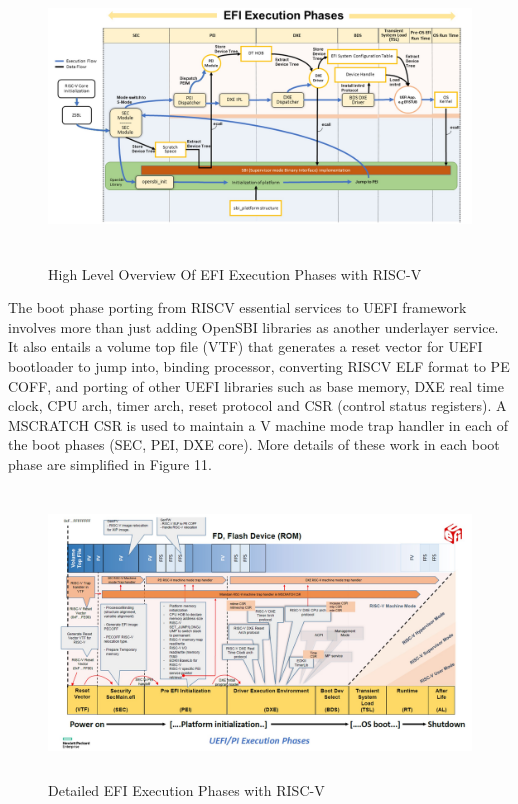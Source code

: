 \documentclass[review]{elsarticle}
\begin{document}
\begin{figure}[H]
	\centering
	\includegraphics[width=1\textwidth,height=3in]{figs/HighLevelOverviewOfEfi.JPG}
	\caption{High Level Overview Of EFI Execution Phases with RISC-V \cite{R51:2}}
\end{figure}

The boot phase porting from RISCV essential services to UEFI framework involves more than just adding OpenSBI libraries as another underlayer service. It also entails a volume top file (VTF) that generates a reset vector for UEFI bootloader to jump into, binding processor, converting RISCV ELF format to PE COFF, and porting of other UEFI libraries such as base memory, DXE real time clock, CPU arch, timer arch, reset protocol and CSR (control status registers). A MSCRATCH CSR is used to maintain a V machine mode trap handler in each of the boot phases (SEC, PEI, DXE core). More details of these work in each boot phase are simplified in Figure 11.

\begin{figure}[H]
	\centering
	\includegraphics[width=1\textwidth,height=3in]{figs/RiscVDetailedEfiFlow.JPG}
	\caption{Detailed EFI Execution Phases with RISC-V \cite{R51:2}}
\end{figure}
\end{document}
